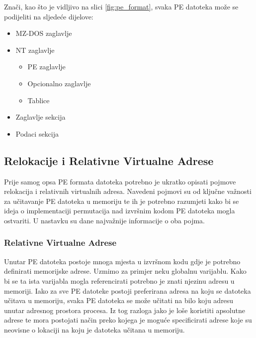 \documentclass[times, utf8, diplomski, numeric]{fer}
\begin{document}
\pagebreak										%

Znači, kao što je vidljivo na slici \ref{fig:pe_format}, svaka PE
datoteka može se podijeliti na sljedeće dijelove:

\begin{itemize}
\item MZ-DOS zaglavlje
\item NT zaglavlje
	\begin{itemize}
	\item PE zaglavlje
	\item Opcionalno zaglavlje
	\item Tablice
	\end{itemize}
\item Zaglavlje sekcija									%
\item Podaci sekcija
\end{itemize}

\pagebreak

\subsection{Relokacije i Relativne Virtualne Adrese}

Prije samog opsa PE formata datoteka potrebno je ukratko
opisati pojmove relokacija i relativnih virtualnih adresa.
Navedeni pojmovi su od ključne važnosti za učitavanje PE datoteka
u memoriju te ih je potrebno razumjeti kako bi se ideja o
implementaciji permutacija nad izvršnim kodom PE datoteka mogla
ostvariti. U nastavku su dane najvažnije informacije o oba pojma.			%

\subsubsection{Relativne Virtualne Adrese}
\label{sct:rva}

Unutar PE datoteka postoje mnoga mjesta u izvršnom kodu gdje je
potrebno definirati memorijske adrese. Uzmimo za primjer neku
globalnu varijablu. Kako bi se ta ista varijabla mogla
referencirati potrebno je znati njezinu adresu u memoriji. Iako
za sve PE datoteke postoji preferirana adresa na koju se datoteka
učitava u memoriju, svaka PE datoteka se može učitati na bilo
koju adresu unutar adresnog prostora procesa. Iz tog razloga jako
je loše koristiti apsolutne adrese te mora postojati način preko
kojega je moguće specificirati adrese koje su neovisne o lokaciji
na koju je datoteka učitana u memoriju.
\end{document}
